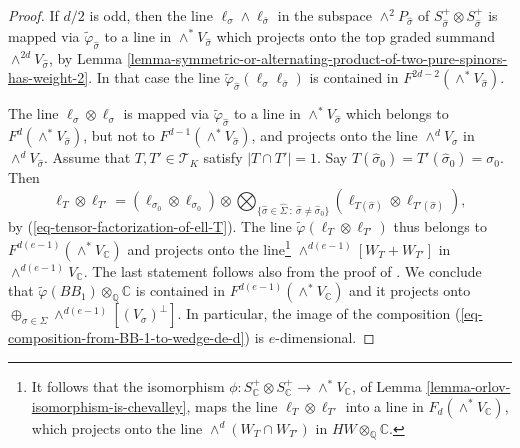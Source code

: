 \documentclass[12pt]{amsart}
\numberwithin{equation}{subsection}
\theoremstyle{plain}
\theoremstyle{definition}
\newcommand{\CC}{{\mathbb C}}
\newcommand{\QQ}{{\mathbb Q}}
\newcommand{\T}{{\mathcal T}}
\newcommand{\RightArrowOf}[1]{\stackrel{#1}{\rightarrow}}
\begin{document}
{\begin{proof}
If $d/2$ is odd, then the line $\ell_\sigma\wedge \ell_{\bar{\sigma}}$ in the subspace $\wedge^2P_{\hat{\sigma}}$ of $S^+_{\hat{\sigma}}\otimes S^+_{\hat{\sigma}}$ is mapped via $\tilde{\varphi}_{\hat{\sigma}}$ to a line in $\wedge^*V_{\hat{\sigma}}$ which 
projects onto the top graded summand $\wedge^{2d}V_{\hat{\sigma}}$, by Lemma \ref{lemma-symmetric-or-alternating-product-of-two-pure-spinors-has-weight-2}. 
In that case the line $\tilde{\varphi}_{\hat{\sigma}}(\ell_\sigma \ell_{\bar{\sigma}})$ is contained in $F^{2d-2}(\wedge^*V_{\hat{\sigma}})$.

The line $\ell_\sigma\otimes\ell_\sigma$  is mapped via $\tilde{\varphi}_{\hat{\sigma}}$ to a line in $\wedge^*V_{\hat{\sigma}}$ which belongs to $F^d(\wedge^*V_{\hat{\sigma}})$, but not to $F^{d-1}(\wedge^*V_{\hat{\sigma}})$, and 
projects onto the line $\wedge^dV_\sigma$ in $\wedge^dV_{\hat{\sigma}}$. Assume that $T,T'\in \T_K$ satisfy $|T\cap T'|=1$. Say $T(\hat{\sigma}_0)=T'(\hat{\sigma}_0)=\sigma_0$. Then
\[
\ell_T\otimes\ell_{T'}=(\ell_{\sigma_0}\otimes\ell_{\sigma_0})\otimes\bigotimes_{\{\hat{\sigma}\in\hat{\Sigma} \ : \ \hat{\sigma}\neq\hat{\sigma}_0\}}(\ell_{T(\hat{\sigma})}\otimes \ell_{T'(\hat{\sigma})}),
\]
by (\ref{eq-tensor-factorization-of-ell-T}).
The line $\tilde{\varphi}(\ell_T\otimes\ell_{T'})$ thus belongs to $F^{d(e-1)}(\wedge^*V_\CC)$ and projects onto the line\footnote{
It follows that the isomorphism $\phi:S^+_\CC\otimes S^+_\CC\rightarrow \wedge^*V_\CC$, of Lemma \ref{lemma-orlov-isomorphism-is-chevalley}, maps the line $\ell_T\otimes\ell_{T'}$
into a line in $F_d(\wedge^*V_\CC)$, which projects onto the line $\wedge^d(W_T\cap W_{T'})$ in $HW\otimes_\QQ\CC.$ 
}
$\wedge^{d(e-1)}[W_T+W_{T'}]$ in $\wedge^{d(e-1)}V_\CC$. The last statement follows also from the proof of \cite[III.3.3]{chevalley}.
We conclude that 
$
\tilde{\varphi}(BB_1)\otimes_\QQ\CC
$
is contained in $F^{d(e-1)}(\wedge^*V_\CC)$ and it projects onto
$
\oplus_{\sigma\in\Sigma}\wedge^{d(e-1)}[(V_\sigma)^\perp].
$
In particular, the image of the composition (\ref{eq-composition-from-BB-1-to-wedge-de-d})
is $e$-dimensional.
\end{proof}

}
\end{document}
